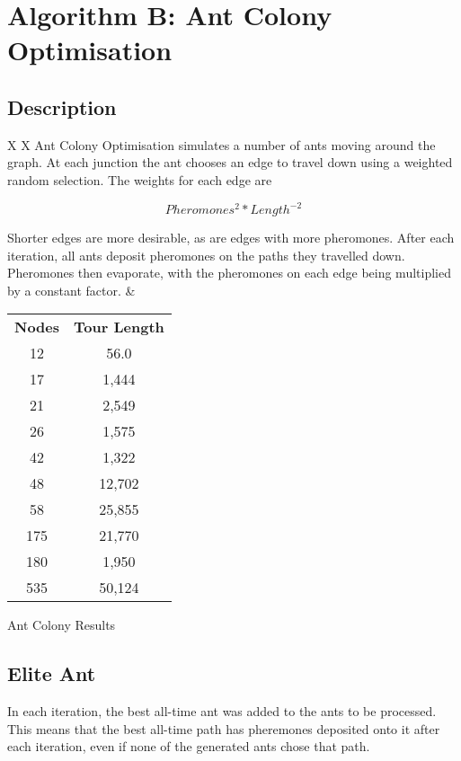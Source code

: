 \documentclass[a4paper, 11pt,table]{article}
\begin{document}
\section{Algorithm B: Ant Colony Optimisation}

\subsection{Description}
\begin{tabu}{X X[c]}
	Ant Colony Optimisation simulates a number of ants moving around the graph. At each junction the ant chooses an edge to travel down using a weighted random selection. The weights for each edge are 
	
	\begin{equation}
	Pheromones^{2}*Length^{-2}
	\end{equation}
	
	 Shorter edges are more desirable, as are edges with more pheromones. After each iteration, all ants deposit pheromones on the paths they travelled down. Pheromones then evaporate, with the pheromones on each edge being multiplied by a constant factor.
	&
	\begin{tabu}{|c c|}\hline
		\textbf{Nodes} & \textbf{Tour Length} \\
		12 & 56.0 \\
		17 & 1,444 \\
		21 & 2,549 \\
		26 & 1,575 \\
		42 & 1,322 \\
		48 & 12,702 \\
		58 & 25,855 \\
		175 & 21,770 \\
		180 & 1,950 \\
		535 & 50,124 \\\hline
	\end{tabu}
	
	\vspace{6pt}
	Ant Colony Results
\end{tabu}

\subsection{Elite Ant}
In each iteration, the best all-time ant was added to the ants to be processed. This means that the best all-time path has pheremones deposited onto it after each iteration, even if none of the generated ants chose that path.
\end{document}
